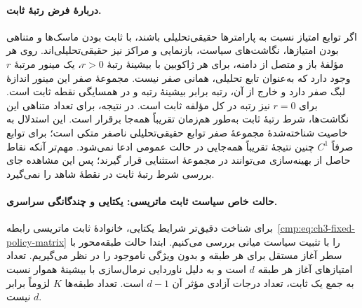 \paragraph{دربارهٔ فرض رتبهٔ ثابت.}
اگر توابع امتیاز نسبت به پارامترها حقیقی‌تحلیلی باشند، با ثابت بودن ماسک‌ها و متناهی بودن امتیازها، نگاشت‌های سیاست، بازنمایی و مراکز نیز حقیقی‌تحلیلی‌اند. روی هر مؤلفهٔ باز و متصل از دامنه، برای هر ژاکوبین با بیشینهٔ رتبهٔ $r>0$، یک مینور مرتبهٔ $r$ وجود دارد که به‌عنوان تابع تحلیلی، همانی صفر نیست. مجموعهٔ صفر این مینور اندازهٔ لبگ صفر دارد و خارج از آن، رتبه برابر بیشینهٔ رتبه و در همسایگی نقطه ثابت است. برای $r=0$ نیز رتبه در کل مؤلفه ثابت است. در نتیجه، برای تعداد متناهی این نگاشت‌ها، شرط رتبهٔ ثابت به‌طور هم‌زمان تقریباً همه‌جا برقرار است. این استدلال به خاصیت شناخته‌شدهٔ مجموعهٔ صفر توابع حقیقی‌تحلیلی ناصفر متکی است؛ برای توابع صرفاً $C^1$ چنین نتیجهٔ تقریباً همه‌جایی در حالت عمومی ادعا نمی‌شود. مهم‌تر آنکه نقاط حاصل از بهینه‌سازی می‌توانند در مجموعهٔ استثنایی قرار گیرند؛ پس این مشاهده جای بررسی شرط رتبهٔ ثابت در نقطهٔ شاهد را نمی‌گیرد.

\paragraph{حالت خاص سیاست ثابت ماتریسی: یکتایی و چندگانگی سراسری.}
برای شناخت دقیق‌تر شرایط یکتایی، خانوادهٔ ثابت ماتریسی رابطه~\eqref{cmp:eq:ch3-fixed-policy-matrix} را با تثبیت سیاست میانی بررسی می‌کنیم. ابتدا حالت طبقه‌محور با سطر آغاز مستقل برای هر طبقه و بدون ویژگی ناموجود را در نظر می‌گیریم. تعداد امتیازهای آغاز هر طبقه $d$ است و به دلیل ناوردایی نرمال‌سازی با بیشینهٔ هموار نسبت به جمع یک ثابت، تعداد درجات آزادی مؤثر آن $d-1$ است. تعداد طبقه‌ها $K$ لزوماً برابر $d$ نیست.

